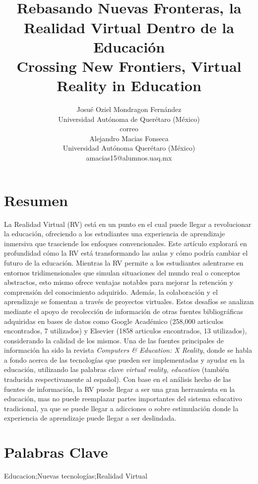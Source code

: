 \documentclass[11pt]{article}
\title{\color{blue}{\fontsize{10}{12}~}\\{\arialblk\fontsize{14}{17}\selectfont Rebasando Nuevas Fronteras, la Realidad Virtual Dentro de la Educación}\\{\barial\fontsize{12}{14}\selectfont Crossing New Frontiers, Virtual Reality in Education}}
\author{
   {\arial\fontsize{12}{14}\selectfont Josué Oziel Mondragon Fernández}\\
   {\arial\fontsize{10}{12}\selectfont Universidad Autónoma de Querétaro (México)}\\
   {\arial\fontsize{10}{12}\selectfont correo}\\
   {\arial\fontsize{12}{14}\selectfont Alejandro Macias Fonseca}\\
   {\arial\fontsize{10}{12}\selectfont Universidad Autónoma Querétaro (México)}\\
   {\arial\fontsize{10}{12}\selectfont amacias15@alumnos.uaq.mx}\\
}
\date{}
\begin{document}
\maketitle

\begin{tcolorbox}[colback=introblock,colframe=introblock]
\section*{\fontsize{10}{12}\barial Resumen}
      {\fontsize{10}{12}La Realidad Virtual (RV) está en un punto en el cual puede llegar a revolucionar la educación, ofreciendo a los estudiantes una experiencia de aprendizaje inmersiva que trasciende los enfoques convencionales. Este artículo explorará en profundidad cómo la RV está transformando las aulas y cómo podría cambiar el futuro de la educación. Mientras la RV permite a los estudiantes adentrarse en entornos tridimensionales que simulan situaciones del mundo real o conceptos abstractos, esto mismo ofrece ventajas notables para mejorar la retención y comprensión del conocimiento adquirido. Además, la colaboración y el aprendizaje se fomentan a través de proyectos virtuales. Estos desafíos se analizan mediante el apoyo de recolección de información de otras fuentes bibliográficas adquiridas en bases de datos como Google Académico (258,000 articulos encontrados, 7 utilizados) y Elsevier (1858 articulos encontrados, 13 utilizados), considerando la calidad de los mismos. Una de las fuentes principales de información ha sido la revista \textit{Computers \& Education: X Reality}, donde se habla a fondo acerca de las tecnologías que pueden ser implementadas y ayudar en la educación, utilizando las palabras clave \textit{virtual reality, education} (también traducida respectivamente al español). Con base en el análisis hecho de las fuentes de información, la RV puede llegar a ser una gran herramienta en la educación, mas no puede reemplazar partes importantes del sistema educativo tradicional, ya que se puede llegar a adicciones o sobre estimulación donde la experiencia de aprendizaje puede llegar a ser deslindada.} 

\section*{\fontsize{10}{12}\barial Palabras Clave}
   {\fontsize{10}{12}Educacion;Nuevas tecnologías;Realidad Virtual}
\end{tcolorbox}
\end{document}
